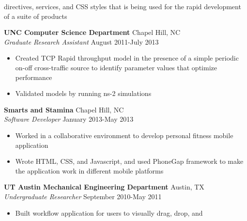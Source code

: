 \documentclass[line,margin,letterpaper]{res}
\begin{document}
\begin{resume}
\begin{itemize}
    directives, services, and CSS styles that is being used for the rapid
    development of a suite of products
  \end{itemize}
  {\bf UNC Computer Science Department} \hfill Chapel Hill, NC \\
  \emph{Graduate Research Assistant} \hfill August 2011-July 2013
  \begin{itemize} \itemsep -2pt
    \item Created TCP Rapid throughput model in the presence of a simple 
    periodic on-off cross-traffic source to identify parameter values that 
    optimize performance
    \item Validated models by running ns-2 simulations
  \end{itemize}
  {\bf Smarts and Stamina} \hfill Chapel Hill, NC \\
  \emph{Software Developer} \hfill January 2013-May 2013
  \begin{itemize} \itemsep -2pt
    \item Worked in a collaborative environment to develop personal fitness
    mobile application
    \item Wrote HTML, CSS, and Javascript, and used PhoneGap framework to make 
    the application work in different mobile platforms
  \end{itemize}
  {\bf UT Austin Mechanical Engineering Department} \hfill Austin, TX \\
  \emph{Undergraduate Researcher} \hfill September 2010-May 2011
  \begin{itemize} \itemsep -2pt
    \item Built workflow application for users to visually drag, drop, and 

\end{itemize}
\end{resume}
\end{document}
